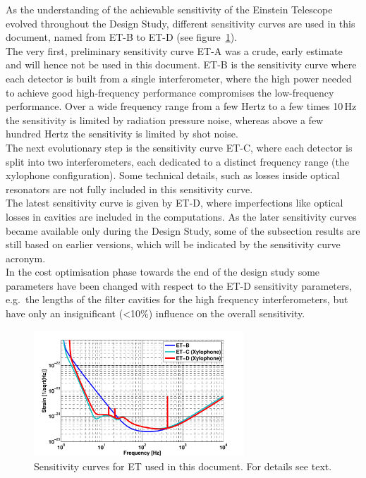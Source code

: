 \begin{tcolorbox}[standard jigsaw,colframe=green!40!black,colback=blanchedalmond!10!white,opacityback=0.6,coltext=black, title= {\bf Sensitivity curves for the Einstein Telescope}]
{As the understanding of the achievable sensitivity of the Einstein Telescope evolved  throughout the Design Study, different sensitivity curves are used in this document,  named from ET-B to ET-D (see figure~\ref{fig:ET_sens_evolution_2}).\\ 
The very first, preliminary sensitivity curve ET-A was a crude, early estimate and will hence not be used in this document. 
ET-B is the sensitivity curve where each detector is built from a single interferometer, where the high power needed to achieve good high-frequency performance compromises the low-frequency performance. Over a wide frequency range from a few Hertz to a few times 10\,Hz the sensitivity is limited by radiation pressure noise, whereas above a few hundred Hertz the sensitivity is limited by shot noise.\\
The next evolutionary step is the sensitivity curve ET-C, where each detector is split into two interferometers, each dedicated to a distinct frequency range (the xylophone configuration). Some technical details, such as losses inside optical resonators are not fully included in this sensitivity curve.\\
The latest sensitivity curve is given by ET-D, where imperfections like optical losses in cavities are included in the computations. As the later sensitivity curves 
became available only during the Design Study, some of the subsection results are still based on earlier versions, which will be indicated by the sensitivity curve acronym.\\
In the cost optimisation phase towards the end of the design study some parameters have been changed with respect to the ET-D sensitivity parameters, e.g.\ the lengths of the filter cavities for the high frequency interferometers, but have only an insignificant (<10\%) influence on the overall sensitivity.
\begin{figure}[H]
	\begin{center}
		\includegraphics[width=0.7\textwidth]{Intro/Intro_Figures/all_sens3.pdf}
\vskip 0.3cm
	\caption{Sensitivity curves for ET used in this document. For details see text.}
	\label{fig:ET_sens_evolution_2}
	\end{center}
\vskip -0.4cm
\end{figure}
}
\end{tcolorbox}

